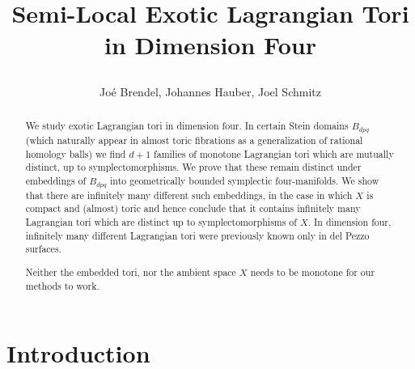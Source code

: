 \documentclass[12pt,a4paper,abstract=true,final]{scrartcl}
\begin{document}
\title{Semi-Local Exotic Lagrangian Tori in Dimension Four\\
\bigskip
{}\vspace{-0.5cm}}
\author{Joé Brendel, Johannes Hauber, Joel Schmitz}

\maketitle

\begin{abstract}
    We study exotic Lagrangian tori in dimension four.
In certain Stein domains $B_{dpq}$ (which naturally appear in almost toric fibrations as a generalization of rational homology balls) we find $d+1$ families of monotone Lagrangian tori which are mutually distinct, up to symplectomorphisms.
We prove that these remain distinct under embeddings of $B_{dpq}$ into geometrically bounded symplectic four-manifolds.
We show that there are infinitely many different such embeddings, in the case in which $X$ is compact and (almost) toric and hence conclude that it contains infinitely many Lagrangian tori which are distinct up to symplectomorphisms of $X$.
In dimension four, infinitely many different Lagrangian tori were previously known
only in del Pezzo surfaces.

    Neither the embedded tori, nor the ambient space $X$ needs to be monotone for our methods to work. 
\end{abstract}

\section{Introduction}
\end{document}

